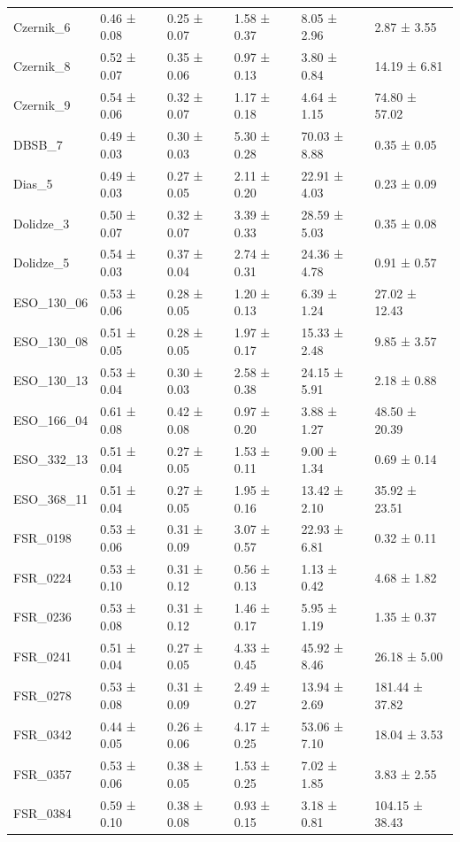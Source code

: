 \begin{tabular}{llllll}
Czernik_6 & 0.46 ± 0.08 & 0.25 ± 0.07 & 1.58 ± 0.37 & 8.05 ± 2.96 & 2.87 ± 3.55 \\
Czernik_8 & 0.52 ± 0.07 & 0.35 ± 0.06 & 0.97 ± 0.13 & 3.80 ± 0.84 & 14.19 ± 6.81 \\
Czernik_9 & 0.54 ± 0.06 & 0.32 ± 0.07 & 1.17 ± 0.18 & 4.64 ± 1.15 & 74.80 ± 57.02 \\
DBSB_7 & 0.49 ± 0.03 & 0.30 ± 0.03 & 5.30 ± 0.28 & 70.03 ± 8.88 & 0.35 ± 0.05 \\
Dias_5 & 0.49 ± 0.03 & 0.27 ± 0.05 & 2.11 ± 0.20 & 22.91 ± 4.03 & 0.23 ± 0.09 \\
Dolidze_3 & 0.50 ± 0.07 & 0.32 ± 0.07 & 3.39 ± 0.33 & 28.59 ± 5.03 & 0.35 ± 0.08 \\
Dolidze_5 & 0.54 ± 0.03 & 0.37 ± 0.04 & 2.74 ± 0.31 & 24.36 ± 4.78 & 0.91 ± 0.57 \\
ESO_130_06 & 0.53 ± 0.06 & 0.28 ± 0.05 & 1.20 ± 0.13 & 6.39 ± 1.24 & 27.02 ± 12.43 \\
ESO_130_08 & 0.51 ± 0.05 & 0.28 ± 0.05 & 1.97 ± 0.17 & 15.33 ± 2.48 & 9.85 ± 3.57 \\
ESO_130_13 & 0.53 ± 0.04 & 0.30 ± 0.03 & 2.58 ± 0.38 & 24.15 ± 5.91 & 2.18 ± 0.88 \\
ESO_166_04 & 0.61 ± 0.08 & 0.42 ± 0.08 & 0.97 ± 0.20 & 3.88 ± 1.27 & 48.50 ± 20.39 \\
ESO_332_13 & 0.51 ± 0.04 & 0.27 ± 0.05 & 1.53 ± 0.11 & 9.00 ± 1.34 & 0.69 ± 0.14 \\
ESO_368_11 & 0.51 ± 0.04 & 0.27 ± 0.05 & 1.95 ± 0.16 & 13.42 ± 2.10 & 35.92 ± 23.51 \\
FSR_0198 & 0.53 ± 0.06 & 0.31 ± 0.09 & 3.07 ± 0.57 & 22.93 ± 6.81 & 0.32 ± 0.11 \\
FSR_0224 & 0.53 ± 0.10 & 0.31 ± 0.12 & 0.56 ± 0.13 & 1.13 ± 0.42 & 4.68 ± 1.82 \\
FSR_0236 & 0.53 ± 0.08 & 0.31 ± 0.12 & 1.46 ± 0.17 & 5.95 ± 1.19 & 1.35 ± 0.37 \\
FSR_0241 & 0.51 ± 0.04 & 0.27 ± 0.05 & 4.33 ± 0.45 & 45.92 ± 8.46 & 26.18 ± 5.00 \\
FSR_0278 & 0.53 ± 0.08 & 0.31 ± 0.09 & 2.49 ± 0.27 & 13.94 ± 2.69 & 181.44 ± 37.82 \\
FSR_0342 & 0.44 ± 0.05 & 0.26 ± 0.06 & 4.17 ± 0.25 & 53.06 ± 7.10 & 18.04 ± 3.53 \\
FSR_0357 & 0.53 ± 0.06 & 0.38 ± 0.05 & 1.53 ± 0.25 & 7.02 ± 1.85 & 3.83 ± 2.55 \\
FSR_0384 & 0.59 ± 0.10 & 0.38 ± 0.08 & 0.93 ± 0.15 & 3.18 ± 0.81 & 104.15 ± 38.43 \\

\end{tabular}
